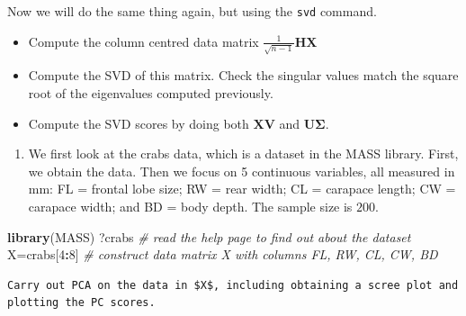 \documentclass[]{book}
\newenvironment{Shaded}{\begin{snugshade}}{\end{snugshade}}
\newcommand{\CommentTok}[1]{\textcolor[rgb]{0.56,0.35,0.01}{\textit{#1}}}
\newcommand{\DataTypeTok}[1]{\textcolor[rgb]{0.13,0.29,0.53}{#1}}
\newcommand{\DecValTok}[1]{\textcolor[rgb]{0.00,0.00,0.81}{#1}}
\newcommand{\KeywordTok}[1]{\textcolor[rgb]{0.13,0.29,0.53}{\textbf{#1}}}
\newcommand{\NormalTok}[1]{#1}
\newcommand{\OperatorTok}[1]{\textcolor[rgb]{0.81,0.36,0.00}{\textbf{#1}}}
\newcommand{\OtherTok}[1]{\textcolor[rgb]{0.56,0.35,0.01}{#1}}
\newcommand{\StringTok}[1]{\textcolor[rgb]{0.31,0.60,0.02}{#1}}
\providecommand{\tightlist}{%
  \setlength{\itemsep}{0pt}\setlength{\parskip}{0pt}}
\theoremstyle{definition}
\theoremstyle{definition}
\theoremstyle{definition}
\theoremstyle{remark}
\begin{document}
Now we will do the same thing again, but using the \texttt{svd} command.

\begin{itemize}
\tightlist
\item
  Compute the column centred data matrix \(\frac{1}{\sqrt{n-1}}\boldsymbol H\boldsymbol X\)
\item
  Compute the SVD of this matrix. Check the singular values match the square root of the eigenvalues computed previously.
\item
  Compute the SVD scores by doing both \(\boldsymbol X\boldsymbol V\) and \(\boldsymbol U\boldsymbol \Sigma\).
\end{itemize}

\begin{enumerate}
\def\labelenumi{\arabic{enumi}.}
\setcounter{enumi}{1}
\tightlist
\item
  We first look at the crabs data, which is a dataset in the MASS library. First, we obtain the data.
  Then we focus on 5 continuous variables, all measured in mm: FL = frontal lobe size; RW = rear width; CL = carapace length;
  CW = carapace width; and BD = body depth. The sample size is \(200\).
\end{enumerate}

\begin{Shaded}
\begin{Highlighting}[]
\KeywordTok{library}\NormalTok{(MASS)}
\NormalTok{?crabs           }\CommentTok{# read the help page to find out about the dataset}
\NormalTok{X=crabs[}\DecValTok{4}\OperatorTok{:}\DecValTok{8}\NormalTok{]     }\CommentTok{# construct data matrix X with columns FL, RW, CL, CW, BD}
\end{Highlighting}
\end{Shaded}

\begin{verbatim}
Carry out PCA on the data in $X$, including obtaining a scree plot and plotting the PC scores.
\end{verbatim}

\begin{Shaded}
\end{Shaded}
\end{document}
